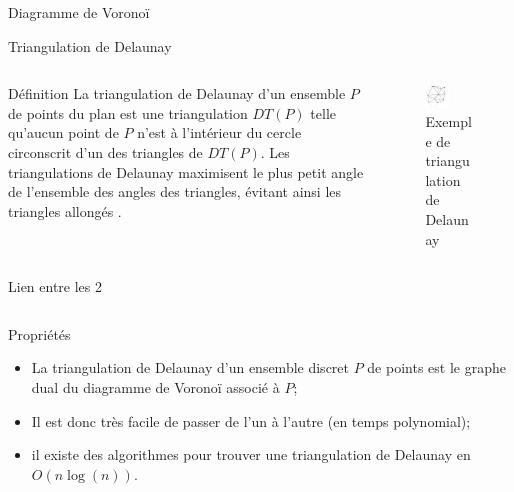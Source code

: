 {\begin{frame}{Diagramme de Voronoï}
            
\end{frame}

\begin{frame}{Triangulation de Delaunay}
    \begin{columns}
        \begin{column}{0.6\textwidth}
            \begin{block}{Définition}
                La triangulation de Delaunay d'un ensemble $P$ de points du plan est une triangulation $DT(P)$ telle qu'aucun point de $P$ n'est à l'intérieur du cercle circonscrit d'un des triangles de $DT(P)$. Les triangulations de Delaunay maximisent le plus petit angle de l'ensemble des angles des triangles, évitant ainsi les triangles \og allongés \fg{}.
            \end{block}
        \end{column}
            
        \begin{column}{0.4\textwidth}
             \begin{figure}
                \includegraphics[width=0.5\textwidth]{images/Delaunay_circumcircles_vectorial.svg.png}
                \caption{\label{fig:del-ex}Exemple de triangulation de Delaunay}
            \end{figure}
        \end{column}
    \end{columns}
\end{frame}

\begin{frame}{Lien entre les 2}
    \begin{columns}
        \begin{column}{0.6\textwidth}
            \begin{block}{Propriétés}
                \begin{itemize}
                    \item La triangulation de Delaunay d’un ensemble discret $P$ de points est le graphe dual du diagramme de Voronoï associé à $P$;
                    \item Il est donc très facile de passer de l'un à l'autre (en temps polynomial);
                    \item il existe des algorithmes pour trouver une triangulation de Delaunay en $O(n\log(n))$.
                \end{itemize}      
            \end{block} 
        \end{column}
            

\end{columns}
\end{frame}}
